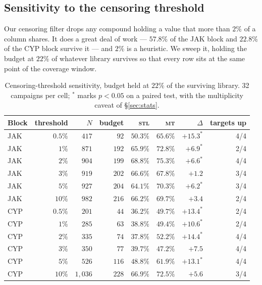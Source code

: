 \documentclass[11pt]{article}
\newcommand{\stl}{\textsc{stl}}
\newcommand{\mt}{\textsc{mt}}
\begin{document}
\subsection{Sensitivity to the censoring threshold}
\label{sec:pilefrac}

Our censoring filter drops any compound holding a value that more than $2\%$ of
a column shares. It does a great deal of work --- $57.8\%$ of the JAK block and
$22.8\%$ of the CYP block survive it --- and $2\%$ is a heuristic. We sweep it,
holding the budget at $22\%$ of whatever library survives so that every row sits
at the same point of the coverage window.

\begin{table}[ht]
\centering\small
\begin{tabular}{lrrrrrrr}
\toprule
Block & threshold & $N$ & budget & \stl{} & \mt{} & $\Delta$ & targets up \\
\midrule
JAK & $0.5\%$ & $417$ & $92$  & $50.3\%$ & $65.6\%$ & $+15.3^{*}$ & 4/4 \\
JAK & $1\%$   & $871$ & $192$ & $65.9\%$ & $72.8\%$ & $+6.9^{*}$  & 2/4 \\
JAK & $2\%$   & $904$ & $199$ & $68.8\%$ & $75.3\%$ & $+6.6^{*}$  & 4/4 \\
JAK & $3\%$   & $919$ & $202$ & $66.6\%$ & $67.8\%$ & $+1.2$      & 3/4 \\
JAK & $5\%$   & $927$ & $204$ & $64.1\%$ & $70.3\%$ & $+6.2^{*}$  & 3/4 \\
JAK & $10\%$  & $982$ & $216$ & $66.2\%$ & $69.7\%$ & $+3.4$      & 2/4 \\
\midrule
CYP & $0.5\%$ & $201$   & $44$  & $36.2\%$ & $49.7\%$ & $+13.4^{*}$ & 2/4 \\
CYP & $1\%$   & $285$   & $63$  & $38.8\%$ & $49.4\%$ & $+10.6^{*}$ & 2/4 \\
CYP & $2\%$   & $335$   & $74$  & $37.8\%$ & $52.2\%$ & $+14.4^{*}$ & 4/4 \\
CYP & $3\%$   & $350$   & $77$  & $39.7\%$ & $47.2\%$ & $+7.5$      & 4/4 \\
CYP & $5\%$   & $526$   & $116$ & $48.8\%$ & $61.9\%$ & $+13.1^{*}$ & 4/4 \\
CYP & $10\%$  & $1{,}036$ & $228$ & $66.9\%$ & $72.5\%$ & $+5.6$    & 3/4 \\
\bottomrule
\end{tabular}
\caption{Censoring-threshold sensitivity, budget held at $22\%$ of the surviving
library. 32 campaigns per cell; $^{*}$ marks $p<0.05$ on a paired test, with the
multiplicity caveat of \S\ref{sec:stats}.}
\label{tab:pilefrac}
\end{table}
\end{document}
